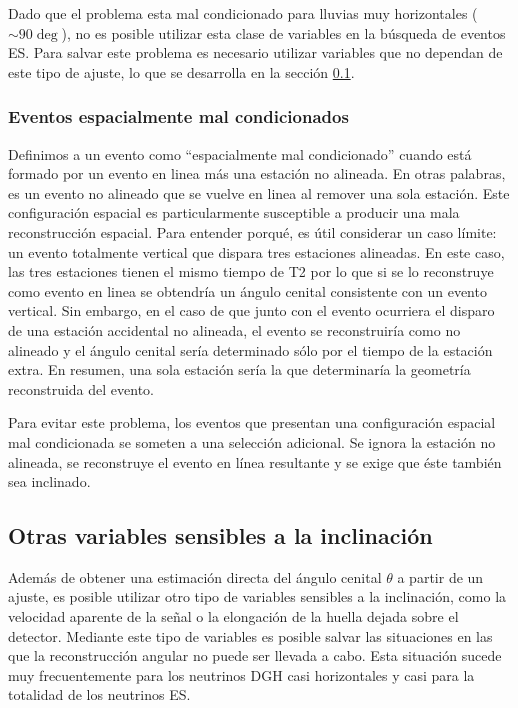 	Dado que el problema esta mal condicionado para lluvias muy horizontales ($\sim90\deg$), no es posible utilizar esta clase de variables en la búsqueda de eventos ES.
	Para salvar este problema es necesario utilizar variables que no dependan de este tipo de ajuste, lo que se desarrolla en la sección \ref{sc:otrasVarIncl}.
	
	\subsubsection{Eventos espacialmente mal condicionados}
	\label{sub:illEvents}
	Definimos a un evento como ``espacialmente mal condicionado'' cuando está formado por un evento en linea más una estación no alineada. En otras palabras, es un evento no alineado que se vuelve en linea al remover una sola estación.
	Este configuración espacial es particularmente susceptible a producir una mala reconstrucción espacial. Para entender porqué, es útil considerar un caso límite: un evento totalmente vertical que dispara tres estaciones alineadas. En este caso, las tres estaciones tienen el mismo tiempo de T2 por lo que si se lo reconstruye como evento en linea se obtendría un ángulo cenital consistente con un evento vertical. Sin embargo, en el caso de que junto con el evento ocurriera el disparo de una estación accidental no alineada, el evento se reconstruiría como no alineado y el ángulo cenital sería determinado sólo por el tiempo de la estación extra. En resumen, una sola estación sería la que determinaría la geometría reconstruida del evento.

	Para evitar este problema, los eventos que presentan una configuración espacial mal condicionada se someten a una selección adicional. 
	Se ignora la estación no alineada, se reconstruye el evento en línea resultante y se exige que éste también sea inclinado.
	
	
	\subsection{Otras variables sensibles a la inclinación}
	\label{sc:otrasVarIncl}
	
	
	Además de obtener una estimación directa del ángulo cenital $\theta$ a partir de un ajuste, es posible utilizar otro tipo de variables sensibles a la inclinación, como la velocidad aparente de la señal o la elongación de la huella dejada sobre el detector.
	Mediante este tipo de variables es posible salvar las situaciones en las que la reconstrucción angular no puede ser llevada a cabo.
	Esta situación sucede muy frecuentemente para los neutrinos DGH casi horizontales y casi para la totalidad de los neutrinos ES.
	
